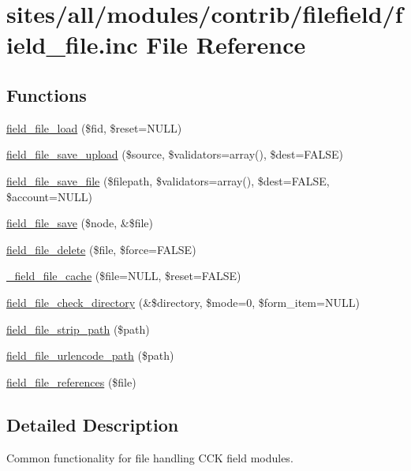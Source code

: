 \hypertarget{field__file_8inc}{
\section{sites/all/modules/contrib/filefield/field\_\-file.inc File Reference}
\label{field__file_8inc}
}
\subsection*{Functions}
\begin{CompactItemize}
\item 
\hyperlink{field__file_8inc_a56eff88e875747bcaacd268163badd9}{field\_\-file\_\-load} (\$fid, \$reset=NULL)
\item 
\hyperlink{field__file_8inc_3bd2944da87148acc1c84eecdb22df66}{field\_\-file\_\-save\_\-upload} (\$source, \$validators=array(), \$dest=FALSE)
\item 
\hyperlink{field__file_8inc_4fd6ba5c832548c4c456e736f6fc25e1}{field\_\-file\_\-save\_\-file} (\$filepath, \$validators=array(), \$dest=FALSE, \$account=NULL)
\item 
\hyperlink{field__file_8inc_10fec707b6053febac35f742ea14a638}{field\_\-file\_\-save} (\$node, \&\$file)
\item 
\hyperlink{field__file_8inc_74e2e4f228eddabf95dc2c8e1b0ebfb4}{field\_\-file\_\-delete} (\$file, \$force=FALSE)
\item 
\hyperlink{field__file_8inc_e131f72d83f71a14c4b4311e654d77f5}{\_\-field\_\-file\_\-cache} (\$file=NULL, \$reset=FALSE)
\item 
\hyperlink{field__file_8inc_1580d32589418f72cd928b93db4c571c}{field\_\-file\_\-check\_\-directory} (\&\$directory, \$mode=0, \$form\_\-item=NULL)
\item 
\hyperlink{field__file_8inc_1131c2060eba36813763eb04dd6d4843}{field\_\-file\_\-strip\_\-path} (\$path)
\item 
\hyperlink{field__file_8inc_f4979515f095d3531c51f752100da7b1}{field\_\-file\_\-urlencode\_\-path} (\$path)
\item 
\hyperlink{field__file_8inc_2750f1d216388271938e7c9b545d2695}{field\_\-file\_\-references} (\$file)
\end{CompactItemize}


\subsection{Detailed Description}
Common functionality for file handling CCK field modules. 


